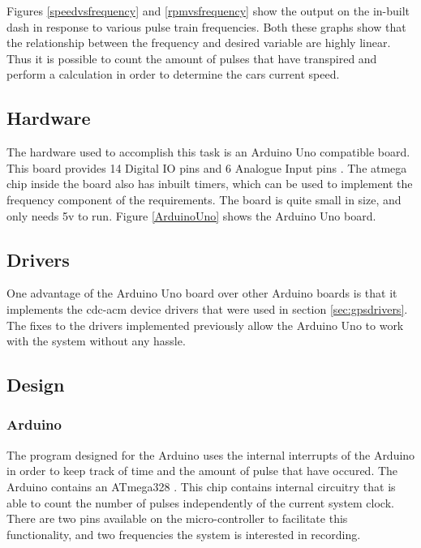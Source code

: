 
Figures \ref{speedvsfrequency} and \ref{rpmvsfrequency} show the output on the in-built dash in response to various pulse train frequencies. Both these graphs show that the relationship between the frequency and desired variable are highly linear. Thus it is possible to count the amount of pulses that have transpired and perform a calculation in order to determine the cars current speed.

\subsection{Hardware}

The hardware used to accomplish this task is an Arduino Uno compatible board. This board provides 14 Digital IO pins and 6 Analogue Input pins \cite{arduinospecs}. The atmega chip inside the board also has inbuilt timers, which can be used to implement the frequency component of the requirements. The board is quite small in size, and only needs 5v to run. Figure \ref{ArduinoUno} shows the Arduino Uno board.


\subsection{ Drivers}

One advantage of the Arduino Uno board over other Arduino boards is that it implements the cdc-acm device drivers that were used in section \ref{sec:gpsdrivers}. The fixes to the drivers implemented previously allow the Arduino Uno to work with the system without any hassle. 

\subsection {Design}

\subsubsection{Arduino}

The program designed for the Arduino uses the internal interrupts of the Arduino in order to keep track of time and the amount of pulse that have occured. The Arduino contains an ATmega328 \cite{arduinospecs}. This chip contains internal circuitry that is able to count the number of pulses independently of the current system clock. There are two pins available on the micro-controller to facilitate this functionality, and two frequencies the system is interested in recording.

